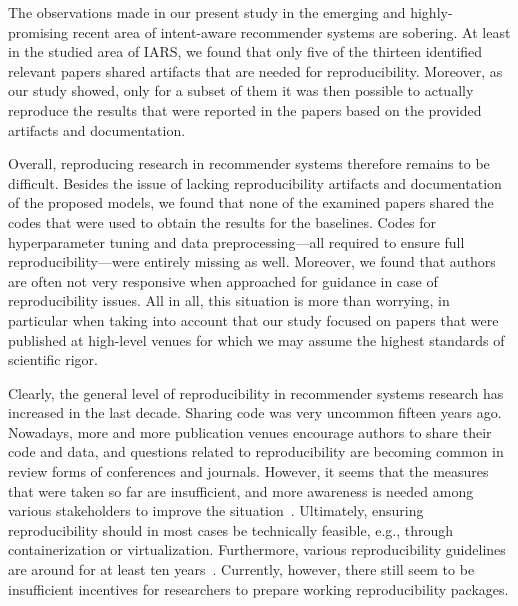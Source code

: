 \documentclass[sigconf,natbib=true,nonacm]{acmart}
\begin{document}
The observations made in our present study in the emerging and highly-promising recent area of intent-aware recommender systems are sobering. At least in the studied area of IARS, we found that only five of the thirteen identified relevant papers shared artifacts that are needed for reproducibility. Moreover, as our study showed, only for a subset of them it was then possible to actually reproduce the results that were reported in the papers based on the provided artifacts and documentation.
\begin{raggedright}
Overall, reproducing research in recommender systems therefore remains to be difficult. Besides the issue of lacking reproducibility artifacts and documentation of the proposed models, we found that none of the examined papers shared the codes that were used to obtain the results for the baselines. Codes for hyperparameter tuning and data preprocessing---all required to ensure full reproducibility---were entirely missing as well. Moreover, we found that authors are often not very responsive when approached for guidance in case of reproducibility issues. All in all, this situation is more than worrying, in particular when taking into account that our study focused on papers that were published at high-level venues for which we may assume the highest standards of scientific rigor.
\end{raggedright}
Clearly, the general level of reproducibility in recommender systems research has increased in the last decade. Sharing code was very uncommon fifteen years ago. Nowadays, more and more publication venues encourage authors to share their code and data, and questions related to reproducibility are becoming common in review forms of conferences and journals. However, it seems that the measures that were taken so far are insufficient, and more awareness is needed among various stakeholders to improve the situation~\cite{bauer2023overcoming}. Ultimately, ensuring reproducibility should in most cases be technically feasible, e.g., through containerization or virtualization. Furthermore, various reproducibility guidelines are around for at least ten years~\cite{Konstan2013Toward}. Currently, however, there still seem to be insufficient incentives for researchers to prepare working reproducibility packages.
\end{document}
